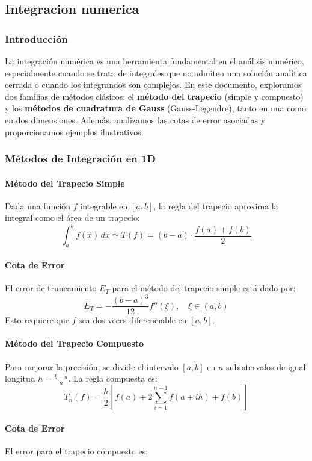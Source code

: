 \documentclass[11pt]{book}
\theoremstyle{definicion}
\theoremstyle{teorema}
\theoremstyle{ejemplo}
\begin{document}
\subsection{Integracion numerica}
\subsubsection{Introducción}
La integración numérica es una herramienta fundamental en el análisis numérico, especialmente cuando se trata de integrales que no admiten una solución analítica cerrada o cuando los integrandos son complejos. En este documento, exploramos dos familias de métodos clásicos: el \textbf{método del trapecio} (simple y compuesto) y los \textbf{métodos de cuadratura de Gauss} (Gauss-Legendre), tanto en una como en dos dimensiones. Además, analizamos las cotas de error asociadas y proporcionamos ejemplos ilustrativos.

\subsubsection{Métodos de Integración en 1D}

\paragraph{Método del Trapecio Simple}
Dada una función \( f \) integrable en \([a, b]\), la regla del trapecio aproxima la integral como el área de un trapecio:
\[
\int_{a}^{b} f(x) \, dx \simeq T(f) = (b - a) \cdot \frac{f(a) + f(b)}{2}
\]

\paragraph{Cota de Error}
El error de truncamiento \( E_T \) para el método del trapecio simple está dado por:
\[
E_T = -\frac{(b - a)^3}{12} f''(\xi), \quad \xi \in (a, b)
\]
Esto requiere que \( f \) sea dos veces diferenciable en \([a, b]\).

\paragraph{Método del Trapecio Compuesto}
Para mejorar la precisión, se divide el intervalo \([a, b]\) en \( n \) subintervalos de igual longitud \( h = \frac{b - a}{n} \). La regla compuesta es:
\[
T_n(f) = \frac{h}{2} \left[ f(a) + 2 \sum_{i=1}^{n-1} f(a + ih) + f(b) \right]
\]

\paragraph{Cota de Error}
El error para el trapecio compuesto es:
\end{document}
